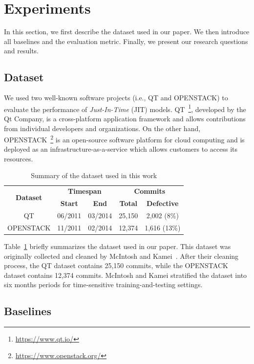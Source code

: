\section{Experiments}
\label{sec:exp}
In this section, we first describe the dataset used in our paper. We then introduce all baselines and the evaluation metric. Finally, we present our research questions and results.

\subsection{Dataset}
\label{sec:dataset}
We used two well-known software projects (i.e., QT and OPENSTACK) to evaluate the performance of \emph{Just-In-Time} (JIT) models. QT~\footnote{\url{https://www.qt.io/}}, developed by the Qt Company, is a cross-platform application framework and allows contributions from individual developers and organizations. On the other hand, OPENSTACK~\footnote{\url{https://www.openstack.org/}} is an open-source software platform for cloud computing and is deployed as an infrastructure-as-a-service which allows customers to access its resources. 

\begin{table}[ht!]
  \centering
  \caption{Summary of the dataset used in this work}
    \begin{tabular}{|c|c|c|c|c|}
    \hline
    \multirow{2}[4]{*}{\textbf{Dataset}} & \multicolumn{2}{c|}{\textbf{Timespan}} & \multicolumn{2}{c|}{\textbf{Commits}} \\
\cline{2-5}          & \textbf{Start} & \textbf{End} & \textbf{Total} & \textbf{Defective} \\
    \hline
    \hline
    QT    & 06/2011 &  03/2014 & 25,150 & 2,002 (8\%) \\
    \hline
    OPENSTACK & 11/2011 &  02/2014 & 12,374 & 1,616 (13\%) \\
    \hline
    \end{tabular}%
  \label{tab:data}%
\end{table}%

Table~\ref{tab:data} briefly summarizes the dataset used in our paper. This dataset was originally collected and cleaned by McIntosh and Kamei~\cite{mcintosh2018fix}. After their cleaning process, the QT dataset contains 25,150 commits, while the OPENSTACK dataset contains 12,374 commits. McIntosh and Kamei stratified the dataset into six months periods for time-sensitive training-and-testing settings.

\subsection{Baselines}
\label{sec:baseline}

